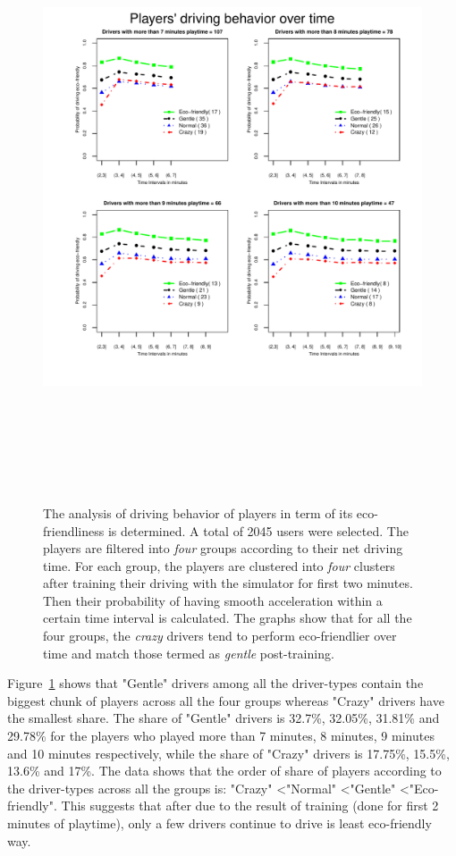 \documentclass[preprint,authoryear,12pt]{elsarticle}
\begin{document}
\begin{figure}[!htb]
	\centering
	\includegraphics[width=1.1\linewidth,height=18.0cm]{ijhcs14-img/Evolution.pdf}
	\caption{The analysis of driving behavior of players in term of its eco-friendliness is determined. A total of 2045 users were selected. The players are filtered into \textit{four} groups according to their net driving time. For each group, the players are clustered into \textit{four} clusters after training their driving with the simulator for first two minutes. Then their probability of having smooth acceleration within a certain time interval is calculated. The graphs show that for all the four groups, the \emph{crazy} drivers tend to perform eco-friendlier over time and match those termed as \textit{gentle} post-training. 
	}
	\label{fig:evolution}
\end{figure}

Figure~\ref{fig:evolution} shows that "Gentle" drivers among all the driver-types contain the biggest chunk of players across all the four groups whereas "Crazy" drivers have the smallest share. The share of "Gentle" drivers is 32.7\%, 32.05\%, 31.81\% and 29.78\% for the players who played more than 7 minutes, 8 minutes, 9 minutes and 10 minutes respectively, while the share of "Crazy" drivers is 17.75\%, 15.5\%, 13.6\% and 17\%. The data shows that the order of share of players according to the driver-types across all the groups is:  "Crazy" \textless "Normal" \textless "Gentle" \textless "Eco-friendly". This suggests that after due to the result of training (done for first 2 minutes of playtime), only a few drivers continue to drive is least eco-friendly way. 
\end{document}
